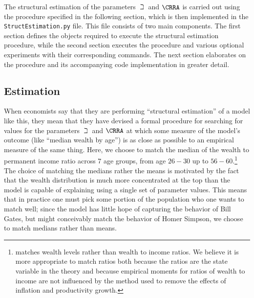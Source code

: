 \documentclass[titlepage, headings=optiontotocandhead]{econtex}
\begin{document}
The structural estimation of the parameters $\beth$ and $\CRRA$ is carried out using
the procedure specified in the following section, which is then implemented in
the \texttt{StructEstimation.py} file. This file consists of two main components. The
first section defines the objects required to execute the structural estimation procedure,
while the second section executes the procedure and various optional
experiments with their corresponding commands. The next section elaborates on the procedure
and its accompanying code implementation in greater detail.

\subsection{Estimation}

When economists say that they are performing ``structural estimation''
of a model like this, they mean that they have devised a
formal procedure for searching for values for the parameters $\beth$
and $\CRRA$ at which some measure of the model's outcome (like
``median wealth by age'') is as close as possible to an empirical measure
of the same thing. Here, we choose to match the median of the
wealth to permanent income ratio across 7 age groups, from age $26-30$
up to $56-60$.\footnote{\cite{cagettiWprofiles}
  matches wealth levels rather than wealth to income ratios. We
  believe it is more appropriate to match ratios both because the
  ratios are the state variable in the theory and because empirical
  moments for ratios of wealth to income are not influenced by the
  method used to remove the effects of inflation and productivity
  growth.} The choice of matching the medians rather the means is
motivated by the fact that the wealth distribution is much more
concentrated at the top than the model is capable of explaining using a single
set of parameter values.  This means that in practice one must pick
some portion of the population who one wants to match well; since the
model has little hope of capturing the behavior of Bill Gates, but
might conceivably match the behavior of Homer Simpson, we choose to
match medians rather than means.
\end{document}
